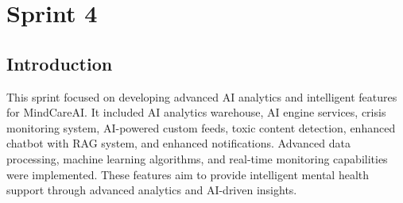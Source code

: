 \section{Sprint 4}
\subsection{Introduction}
This sprint focused on developing advanced AI analytics and intelligent features for MindCareAI.
It included AI analytics warehouse, AI engine services, crisis monitoring system, AI-powered custom feeds, toxic content detection, enhanced chatbot with RAG system, and enhanced notifications.
Advanced data processing, machine learning algorithms, and real-time monitoring capabilities were implemented.
These features aim to provide intelligent mental health support through advanced analytics and AI-driven insights.

